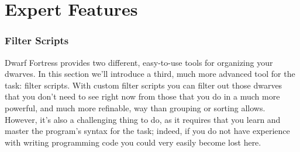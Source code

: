 \documentclass[]{article}
\begin{document}
\newpage
\begin{figure}[h!]
    \vspace*{-2cm}
\end{figure}
\newpage

\part{Expert Features}
\label{sec:Expert Features}
\section{Filter Scripts}
\label{sec:Filter Scripts}

Dwarf Fortress provides two different, easy-to-use tools for organizing your dwarves. In this section
we'll introduce a third, much more advanced tool for the task: filter scripts. With custom filter scripts
you can filter out those dwarves that you don't need to see right now from those that you do in a much
more powerful, and much more refinable, way than grouping or sorting allows. However, it's also a
challenging thing to do, as it requires that you learn and master the program's syntax for the task;
indeed, if you do not have experience with writing programming code you could very easily become lost
here.
\end{document}
